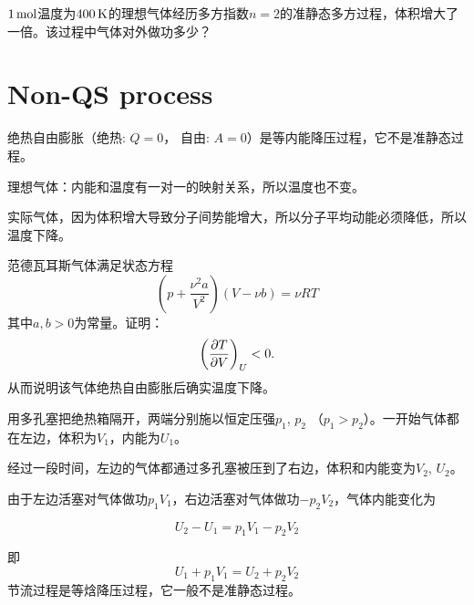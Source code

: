 \documentclass[CJK]{beamer}
\begin{document}
\begin{frame}
  \bchL
  $1\,\mathrm{mol}$温度为$400\,\mathrm{K}$的理想气体经历多方指数$n=2$的准静态多方过程，体积增大了一倍。该过程中气体对外做功多少？
  \echL
\end{frame}

\section{Non-QS process}


\begin{frame}
  \bchL
      {\blue 绝热自由膨胀（绝热: $Q=0$，  自由: $A=0$）是等内能降压过程，它不是准静态过程。}
      
  \bitem
\item{理想气体：内能和温度有一对一的映射关系，所以温度也不变。}
\item{实际气体，因为体积增大导致分子间势能增大，所以分子平均动能必须降低，所以温度下降。}
  \eitem

  \echL
\end{frame}

\begin{frame}
  \bchL
  范德瓦耳斯气体满足状态方程
  $$ \left(p+\frac{\nu^2 a}{V^2}\right)(V-\nu b) = \nu RT$$
  其中$a, b>0$为常量。证明：
  $$ \left(\frac{\partial T}{\partial V}\right)_{U} < 0. $$
  从而说明该气体绝热自由膨胀后确实温度下降。
  \echL
\end{frame}



\begin{frame}
\bch

\emini
{}
用多孔塞把绝热箱隔开，两端分别施以恒定压强$p_1$, $p_2$ （$p_1>p_2$）。一开始气体都在左边，体积为$V_1$，内能为$U_1$。
\emini

经过一段时间，左边的气体都通过多孔塞被压到了右边，体积和内能变为$V_2$, $U_2$。

由于左边活塞对气体做功$p_1V_1$，右边活塞对气体做功$-p_2V_2$，气体内能变化为

$$U_2 - U_1  = p_1V_1 - p_2V_2$$

即
$$ U_1 + p_1V_1 = U_2 + p_2V_2 $$
{\blue 节流过程是等焓降压过程，它一般不是准静态过程。}
\ech
\end{frame}
\end{document}
